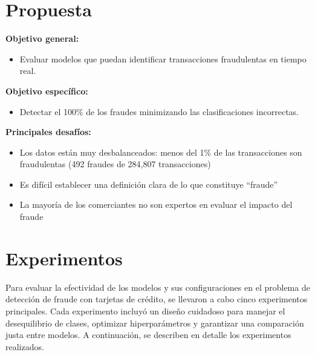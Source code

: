 \documentclass[9pt,a4paper,twoside]{rho-class/rho}
\begin{document}
    \section{Propuesta}

        \textbf{Objetivo general:} 
            \begin{itemize}
                \item Evaluar modelos que puedan identificar transacciones fraudulentas en tiempo real.
            \end{itemize}
        \textbf{Objetivo específico:}
            \begin{itemize}
                \item Detectar el 100\% de los fraudes minimizando las clasificaciones incorrectas.
            \end{itemize}
        
        \textbf{Principales desafíos:}
            \begin{itemize}
               \item Los datos están muy desbalanceados: menos del 1\% de las transacciones son fraudulentas (492 fraudes de 284,807 transacciones)
               \item Es difícil establecer una definición clara de lo que constituye ``fraude''
               \item La mayoría de los comerciantes no son expertos en evaluar el impacto del fraude
            \end{itemize}
    \section{Experimentos}
        Para evaluar la efectividad de los modelos y sus configuraciones en el problema de detección de fraude con tarjetas de crédito, se llevaron a cabo cinco experimentos principales. Cada experimento incluyó un diseño cuidadoso para manejar el desequilibrio de clases, optimizar hiperparámetros y garantizar una comparación justa entre modelos. A continuación, se describen en detalle los experimentos realizados.
\end{document}
